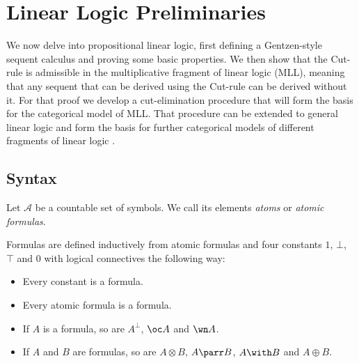 \documentclass[DIN, pagenumber=false, fontsize=11pt, parskip=half, colorinlistoftodos, svgnames]{scrartcl}
\newcommand{\urgentnote}[2][]{\todo[color=red, #1]{#2}}
\begin{document}
	\fi 



	
	\section{Linear Logic Preliminaries}
	
	
	We now delve into propositional linear logic, first defining a Gentzen-style sequent calculus and proving some basic properties.
	We then show that the Cut-rule is admissible in the multiplicative fragment of linear logic (MLL), meaning that any sequent that can be derived using the Cut-rule can be derived without it. 
	For that proof we develop a cut-elimination procedure that will form the basis for the categorical model of MLL.
	That procedure can be extended to general linear logic \cite{brauner} and form the basis for further categorical models of different fragments of linear logic \cite{mellies}.
	
	\subsection{Syntax}
	
	
	\begin{definition}
		Let $\mathcal{A}$ be a countable set of symbols. We call its elements \emph{atoms} or \emph{atomic formulas}. 
	\end{definition}
	
	\begin{definition}[Formula]
		Formulas are defined inductively from atomic formulas and four constants $1$, $\bot$, $\top$ and $0$ with logical  connectives the following way:
		\begin{itemize}
			\item Every constant is a formula.
			\item Every atomic formula is a formula.
			\item If $A$ is a formula, so are $A^\bot$,  $\oc A$ and $\wn A$.
			\item If $A$ and $B$ are formulas, so are $A \otimes B$, $A \parr B$, $A \with B$ and $A \oplus B$.
		\end{itemize}
	\end{definition}
	
\end{document}
